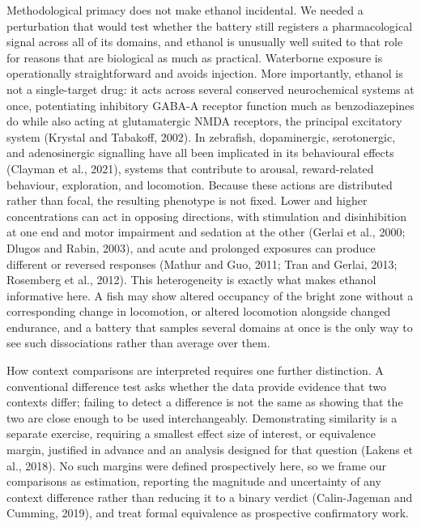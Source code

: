 \documentclass[12pt,a4paper]{article}
\begin{document}
Methodological primacy does not make ethanol incidental. We needed a perturbation that would test whether the battery still registers a pharmacological signal across all of its domains, and ethanol is unusually well suited to that role for reasons that are biological as much as practical. Waterborne exposure is operationally straightforward and avoids injection. More importantly, ethanol is not a single-target drug: it acts across several conserved neurochemical systems at once, potentiating inhibitory GABA-A receptor function much as benzodiazepines do while also acting at glutamatergic NMDA receptors, the principal excitatory system (Krystal and Tabakoff, 2002). In zebrafish, dopaminergic, serotonergic, and adenosinergic signalling have all been implicated in its behavioural effects (Clayman et al., 2021), systems that contribute to arousal, reward-related behaviour, exploration, and locomotion. Because these actions are distributed rather than focal, the resulting phenotype is not fixed. Lower and higher concentrations can act in opposing directions, with stimulation and disinhibition at one end and motor impairment and sedation at the other (Gerlai et al., 2000; Dlugos and Rabin, 2003), and acute and prolonged exposures can produce different or reversed responses (Mathur and Guo, 2011; Tran and Gerlai, 2013; Rosemberg et al., 2012). This heterogeneity is exactly what makes ethanol informative here. A fish may show altered occupancy of the bright zone without a corresponding change in locomotion, or altered locomotion alongside changed endurance, and a battery that samples several domains at once is the only way to see such dissociations rather than average over them.

How context comparisons are interpreted requires one further distinction. A conventional difference test asks whether the data provide evidence that two contexts differ; failing to detect a difference is not the same as showing that the two are close enough to be used interchangeably. Demonstrating similarity is a separate exercise, requiring a smallest effect size of interest, or equivalence margin, justified in advance and an analysis designed for that question (Lakens et al., 2018). No such margins were defined prospectively here, so we frame our comparisons as estimation, reporting the magnitude and uncertainty of any context difference rather than reducing it to a binary verdict (Calin-Jageman and Cumming, 2019), and treat formal equivalence as prospective confirmatory work.
\end{document}
